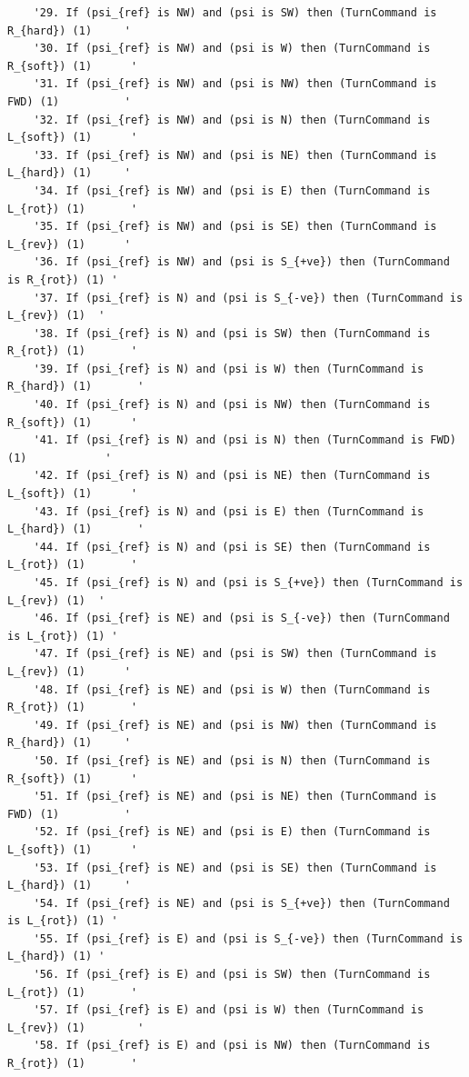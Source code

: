 \documentclass[10pt]{article}
\begin{document}
\begin{verbatim}
    '29. If (psi_{ref} is NW) and (psi is SW) then (TurnCommand is R_{hard}) (1)     '
    '30. If (psi_{ref} is NW) and (psi is W) then (TurnCommand is R_{soft}) (1)      '
    '31. If (psi_{ref} is NW) and (psi is NW) then (TurnCommand is FWD) (1)          '
    '32. If (psi_{ref} is NW) and (psi is N) then (TurnCommand is L_{soft}) (1)      '
    '33. If (psi_{ref} is NW) and (psi is NE) then (TurnCommand is L_{hard}) (1)     '
    '34. If (psi_{ref} is NW) and (psi is E) then (TurnCommand is L_{rot}) (1)       '
    '35. If (psi_{ref} is NW) and (psi is SE) then (TurnCommand is L_{rev}) (1)      '
    '36. If (psi_{ref} is NW) and (psi is S_{+ve}) then (TurnCommand is R_{rot}) (1) '
    '37. If (psi_{ref} is N) and (psi is S_{-ve}) then (TurnCommand is L_{rev}) (1)  '
    '38. If (psi_{ref} is N) and (psi is SW) then (TurnCommand is R_{rot}) (1)       '
    '39. If (psi_{ref} is N) and (psi is W) then (TurnCommand is R_{hard}) (1)       '
    '40. If (psi_{ref} is N) and (psi is NW) then (TurnCommand is R_{soft}) (1)      '
    '41. If (psi_{ref} is N) and (psi is N) then (TurnCommand is FWD) (1)            '
    '42. If (psi_{ref} is N) and (psi is NE) then (TurnCommand is L_{soft}) (1)      '
    '43. If (psi_{ref} is N) and (psi is E) then (TurnCommand is L_{hard}) (1)       '
    '44. If (psi_{ref} is N) and (psi is SE) then (TurnCommand is L_{rot}) (1)       '
    '45. If (psi_{ref} is N) and (psi is S_{+ve}) then (TurnCommand is L_{rev}) (1)  '
    '46. If (psi_{ref} is NE) and (psi is S_{-ve}) then (TurnCommand is L_{rot}) (1) '
    '47. If (psi_{ref} is NE) and (psi is SW) then (TurnCommand is L_{rev}) (1)      '
    '48. If (psi_{ref} is NE) and (psi is W) then (TurnCommand is R_{rot}) (1)       '
    '49. If (psi_{ref} is NE) and (psi is NW) then (TurnCommand is R_{hard}) (1)     '
    '50. If (psi_{ref} is NE) and (psi is N) then (TurnCommand is R_{soft}) (1)      '
    '51. If (psi_{ref} is NE) and (psi is NE) then (TurnCommand is FWD) (1)          '
    '52. If (psi_{ref} is NE) and (psi is E) then (TurnCommand is L_{soft}) (1)      '
    '53. If (psi_{ref} is NE) and (psi is SE) then (TurnCommand is L_{hard}) (1)     '
    '54. If (psi_{ref} is NE) and (psi is S_{+ve}) then (TurnCommand is L_{rot}) (1) '
    '55. If (psi_{ref} is E) and (psi is S_{-ve}) then (TurnCommand is L_{hard}) (1) '
    '56. If (psi_{ref} is E) and (psi is SW) then (TurnCommand is L_{rot}) (1)       '
    '57. If (psi_{ref} is E) and (psi is W) then (TurnCommand is L_{rev}) (1)        '
    '58. If (psi_{ref} is E) and (psi is NW) then (TurnCommand is R_{rot}) (1)       '

\end{verbatim}
\end{document}
